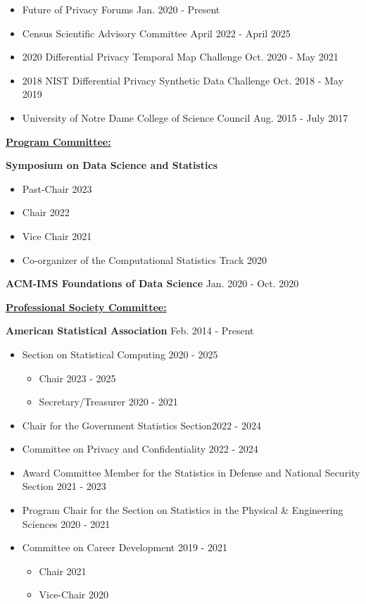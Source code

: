\documentclass[11pt, letterpaper, roman]{moderncv} %
\newcommand{\professionalspace}{\vspace{8pt}}
\newcommand{\leadershipspace}{\vspace{5pt}}
\begin{document}
\begin{itemize}
    \item Future of Privacy Forums \hfill Jan. 2020 - Present
    \item Census Scientific Advisory Committee \hfill April 2022 - April 2025
    \item 2020 Differential Privacy Temporal Map Challenge \hfill Oct. 2020 - May 2021
    \item 2018 NIST Differential Privacy Synthetic Data Challenge \hfill Oct. 2018 - May 2019
    \item University of Notre Dame College of Science Council \hfill Aug. 2015 - July 2017
\end{itemize}

\professionalspace
\underline{\textbf{\large Program Committee:}}\normalsize

\textbf{Symposium on Data Science and Statistics}
\begin{itemize}
    \item Past-Chair \hfill 2023
    \item Chair \hfill 2022
    \item Vice Chair \hfill 2021
    \item Co-organizer of the Computational Statistics Track \hfill 2020
\end{itemize}
\leadershipspace
\textbf{ACM-IMS Foundations of Data Science} \hfill Jan. 2020 - Oct. 2020

\professionalspace
\underline{\textbf{\large Professional Society Committee:}}\normalsize

\textbf{American Statistical Association} \hfill Feb. 2014 - Present
    \begin{itemize}
        \item Section on Statistical Computing \hfill 2020 - 2025
        \begin{itemize}
            \item Chair \hfill 2023 - 2025
            \item Secretary/Treasurer \hfill 2020 - 2021
        \end{itemize}
        \item Chair for the Government Statistics Section\hfill 2022 - 2024
        \item Committee on Privacy and Confidentiality \hfill 2022 - 2024
        \item Award Committee Member for the Statistics in Defense and National Security Section \hfill 2021 - 2023
        \item Program Chair for the Section on Statistics in the Physical \& Engineering Sciences \hfill 2020 - 2021
        \item Committee on Career Development \hfill 2019 - 2021
        \begin{itemize}
            \item Chair \hfill 2021
            \item Vice-Chair \hfill 2020
        \end{itemize}
    \end{itemize}
    
\end{document}
